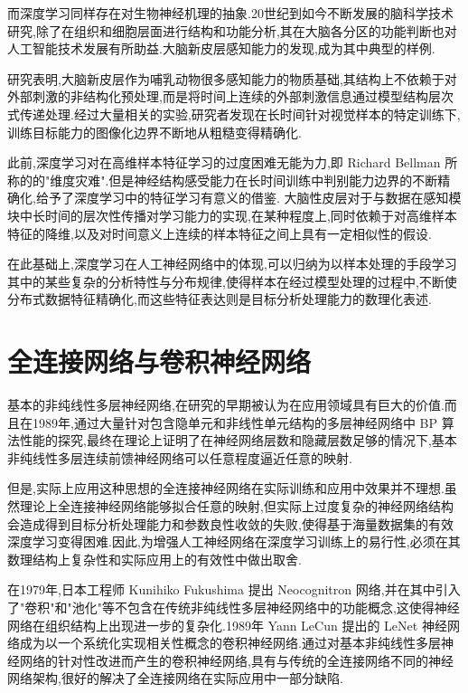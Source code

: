 而深度学习同样存在对生物神经机理的抽象.20世纪到如今不断发展的脑科学技术研究,除了在组织和细胞层面进行结构和功能分析,其在大脑各分区的功能判断也对人工智能技术发展有所助益.大脑新皮层感知能力的发现,成为其中典型的样例.

研究表明,大脑新皮层作为哺乳动物很多感知能力的物质基础,其结构上不依赖于对外部刺激的非结构化预处理,而是将时间上连续的外部刺激信息通过模型结构层次式传递处理.经过大量相关的实验,研究者发现在长时间针对视觉样本的特定训练下,训练目标能力的图像化边界不断地从粗糙变得精确化.

此前,深度学习对在高维样本特征学习的过度困难无能为力,即 Richard Bellman 所称的的"维度灾难".但是神经结构感受能力在长时间训练中判别能力边界的不断精确化,给予了深度学习中的特征学习有意义的借鉴. 大脑性皮层对于与数据在感知模块中长时间的层次性传播对学习能力的实现,在某种程度上,同时依赖于对高维样本特征的降维,以及对时间意义上连续的样本特征之间上具有一定相似性的假设.

在此基础上,深度学习在人工神经网络中的体现,可以归纳为以样本处理的手段学习其中的某些复杂的分析特性与分布规律,使得样本在经过模型处理的过程中,不断使分布式数据特征精确化,而这些特征表达则是目标分析处理能力的数理化表述.

\section{全连接网络与卷积神经网络}
基本的非纯线性多层神经网络,在研究的早期被认为在应用领域具有巨大的价值.而且在1989年,通过大量针对包含隐单元和非线性单元结构的多层神经网络中 BP 算法性能的探究,最终在理论上证明了在神经网络层数和隐藏层数足够的情况下,基本非纯线性多层连续前馈神经网络可以任意程度逼近任意的映射.

但是,实际上应用这种思想的全连接神经网络在实际训练和应用中效果并不理想.虽然理论上全连接神经网络能够拟合任意的映射,但实际上过度复杂的神经网络结构会造成得到目标分析处理能力和参数良性收敛的失败,使得基于海量数据集的有效深度学习变得困难.因此,为增强人工神经网络在深度学习训练上的易行性,必须在其数理结构上复杂性和实际应用上的有效性中做出取舍.

在1979年,日本工程师 Kunihiko Fukushima 提出 Neocognitron 网络,并在其中引入了"卷积"和"池化"等不包含在传统非纯线性多层神经网络中的功能概念,这使得神经网络在组织结构上出现进一步的复杂化.1989年 Yann LeCun 提出的 LeNet 神经网络成为以一个系统化实现相关性概念的卷积神经网络.通过对基本非纯线性多层神经网络的针对性改进而产生的卷积神经网络,具有与传统的全连接网络不同的神经网络架构,很好的解决了全连接网络在实际应用中一部分缺陷.

